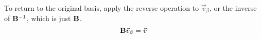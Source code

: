 \begin{enumerate}
{%



To return to the original basis, apply the reverse operation to $\vec{v}_\beta$, or the inverse of $\mathbf{B}^{-1}$, which is just $\mathbf{B}$.
$$\mathbf{B}\vec{v}_{\beta} = \vec{v}$$
}

\end{enumerate}